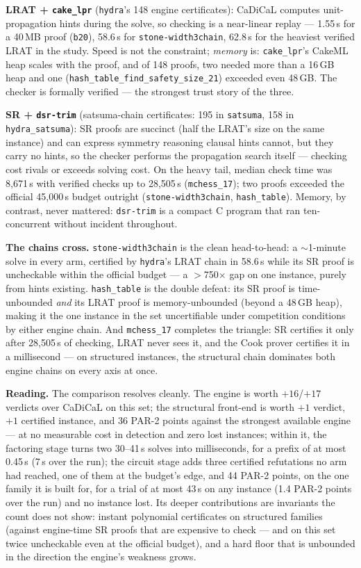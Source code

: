 \documentclass[10pt]{article}
\begin{document}
\textbf{LRAT + \texttt{cake\_lpr}} (\texttt{hydra}'s 148 engine
certificates): CaDiCaL computes unit-propagation hints during the
solve, so checking is a near-linear replay --- 1.55\,s for a 40\,MB
proof (\texttt{b20}), 58.6\,s for \texttt{stone-width3chain},
62.8\,s for the heaviest verified LRAT in the study. Speed is not
the constraint; \emph{memory} is: \texttt{cake\_lpr}'s CakeML heap
scales with the proof, and of 148 proofs, two needed more than a
16\,GB heap and one (\texttt{hash\_table\_find\_safety\_size\_21})
exceeded even 48\,GB. The checker is formally verified --- the
strongest trust story of the three.

\textbf{SR + \texttt{dsr-trim}} (satsuma-chain certificates: 195 in
\texttt{satsuma}, 158 in \texttt{hydra\_satsuma}): SR proofs are
succinct (half the LRAT's size on the same instance) and can express
symmetry reasoning clausal hints cannot, but they carry no hints, so
the checker performs the propagation search itself --- checking cost
rivals or exceeds solving cost. On the heavy tail, median check time
was 8{,}671\,s with verified checks up to 28{,}505\,s
(\texttt{mchess\_17}); two proofs exceeded the official 45{,}000\,s
budget outright (\texttt{stone-width3chain},
\texttt{hash\_table}). Memory, by contrast, never mattered:
\texttt{dsr-trim} is a compact C program that ran ten-concurrent
without incident throughout.

\textbf{The chains cross.} \texttt{stone-width3chain} is the clean
head-to-head: a $\sim$1-minute solve in every arm, certified by
\texttt{hydra}'s LRAT chain in 58.6\,s while its SR proof is
uncheckable within the official budget --- a $>$750$\times$ gap on
one instance, purely from hints existing. \texttt{hash\_table} is
the double defeat: its SR proof is time-unbounded \emph{and} its
LRAT proof is memory-unbounded (beyond a 48\,GB heap), making it the
one instance in the set uncertifiable under competition conditions
by either engine chain. And \texttt{mchess\_17} completes the
triangle: SR certifies it only after 28{,}505\,s of checking, LRAT
never sees it, and the Cook prover certifies it in a millisecond ---
on structured instances, the structural chain dominates both engine
chains on every axis at once.

\textbf{Reading.} The comparison resolves cleanly. The engine is worth
$+16$/$+17$ verdicts over CaDiCaL on this set; the structural
front-end is worth $+1$ verdict, $+1$ certified instance, and 36
PAR-2 points against the strongest available engine --- at no
measurable cost in detection and zero lost instances; within it, the
factoring stage turns two 30--41\,s solves into milliseconds, for a
prefix of at most 0.45\,s (7\,s over the run); the circuit stage adds
three certified refutations no arm had reached, one of them at the
budget's edge, and 44 PAR-2 points, on the one family it is built for,
for a trial of at most 43\,s on any instance (1.4 PAR-2 points over
the run) and no instance lost. Its
deeper contributions are invariants the count does not show: instant polynomial certificates on structured families
(against engine-time SR proofs that are expensive to check --- and
on this set twice uncheckable even at the official budget), and a
hard floor that is unbounded in the direction the engine's weakness
grows.
\end{document}
